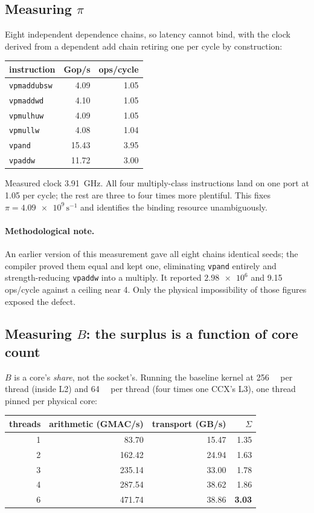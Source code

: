 \documentclass[11pt,a4paper]{article}
\newcommand{\code}[1]{\texttt{#1}}
\begin{document}
\subsection{Measuring $\pi$}
Eight independent dependence chains, so latency cannot bind, with the clock
derived from a dependent add chain retiring one per cycle by construction:

\begin{center}
\begin{tabular}{lrr}
\toprule
instruction & Gop/s & ops/cycle \\
\midrule
\code{vpmaddubsw} & 4.09 & 1.05 \\
\code{vpmaddwd}   & 4.10 & 1.05 \\
\code{vpmulhuw}   & 4.09 & 1.05 \\
\code{vpmullw}    & 4.08 & 1.04 \\
\code{vpand}      & 15.43 & 3.95 \\
\code{vpaddw}     & 11.72 & 3.00 \\
\bottomrule
\end{tabular}
\end{center}

Measured clock \SI{3.91}{\giga\hertz}. All four multiply-class instructions land
on one port at 1.05 per cycle; the rest are three to four times more plentiful.
This fixes $\pi=\num{4.09e9}\,\mathrm{s^{-1}}$ and identifies the binding
resource unambiguously.

\paragraph{Methodological note.} An earlier version of this measurement gave all
eight chains identical seeds; the compiler proved them equal and kept one,
eliminating \code{vpand} entirely and strength-reducing \code{vpaddw} into a
multiply. It reported $\num{2.98e6}$ and \num{9.15} ops/cycle against a ceiling
near 4. Only the physical impossibility of those figures exposed the defect.

\subsection{Measuring $B$: the surplus is a function of core count}
$B$ is a core's \emph{share}, not the socket's. Running the baseline kernel at
\SI{256}{\kibi\byte} per thread (inside L2) and \SI{64}{\mebi\byte} per thread
(four times one CCX's L3), one thread pinned per physical core:

\begin{center}
\begin{tabular}{rrrr}
\toprule
threads & arithmetic (GMAC/s) & transport (GB/s) & $\Sigma$ \\
\midrule
1 & 83.70  & 15.47 & 1.35 \\
2 & 162.42 & 24.94 & 1.63 \\
3 & 235.14 & 33.00 & 1.78 \\
4 & 287.54 & 38.62 & 1.86 \\
6 & 471.74 & 38.86 & \textbf{3.03} \\
\bottomrule
\end{tabular}
\end{center}
\end{document}
